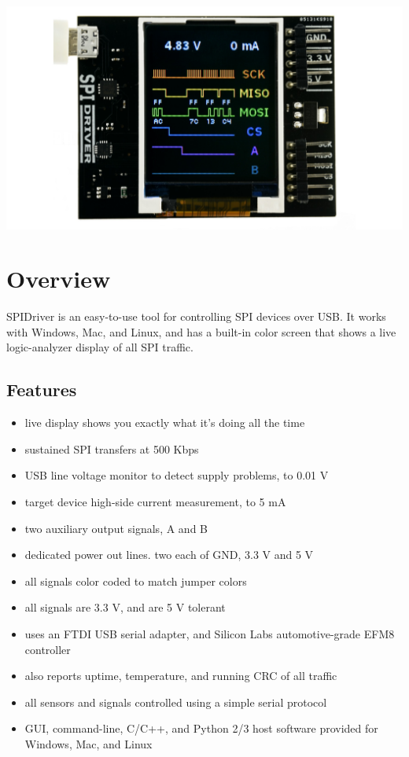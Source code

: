 \documentclass{article}
\begin{document}
\newpage
\begin{center}
\includegraphics[width=1.00\textwidth]{img/spidriver/main}
\end{center}
\tableofcontents

\newpage

\setlength{\parindent}{0mm}
\setlength{\parskip}{1mm}

\section{Overview}

SPIDriver is an easy-to-use tool for controlling SPI devices over USB.
It works with Windows, Mac, and Linux, and has a built-in color screen that shows a live logic-analyzer display of all SPI traffic.

\subsection{Features}
\begin{itemize}
\item live display shows you exactly what it’s doing all the time
\item sustained SPI transfers at 500 Kbps
\item USB line voltage monitor to detect supply problems, to 0.01 V
\item target device high-side current measurement, to 5 mA
\item two auxiliary output signals, A and B
\item dedicated power out lines. two each of GND, 3.3 V and 5 V
\item all signals color coded to match jumper colors
\item all signals are 3.3 V, and are 5 V tolerant
\item uses an FTDI USB serial adapter, and Silicon Labs automotive-grade EFM8 controller
\item also reports uptime, temperature, and running CRC of all traffic
\item all sensors and signals controlled using a simple serial protocol
\item GUI, command-line, C/C++, and Python 2/3 host software provided for Windows, Mac, and Linux
\end{itemize}
\end{document}
